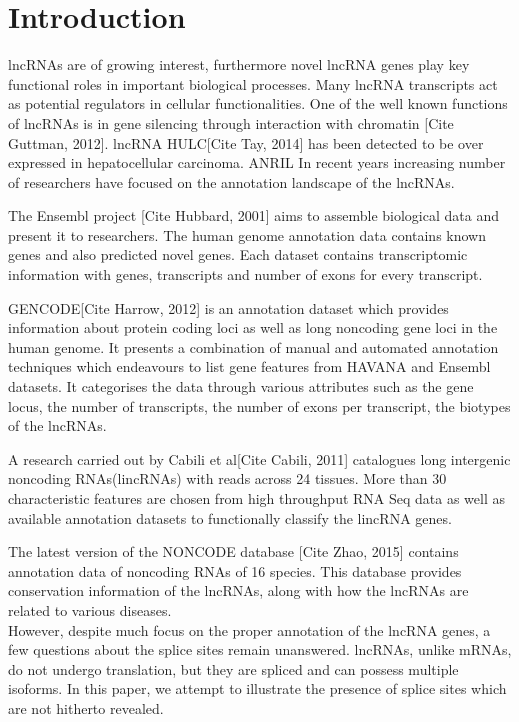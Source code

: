 \documentclass[ncrna,article,submit,moreauthors,pdftex,10pt,a4paper]{mdpi}
\begin{document}
\section{Introduction}

lncRNAs are of growing interest, furthermore novel lncRNA genes play key functional roles in important biological processes.
Many lncRNA transcripts act as potential regulators in cellular functionalities. One of the well known functions of lncRNAs is 
in gene silencing through interaction with chromatin [Cite Guttman, 2012]. lncRNA HULC[Cite Tay, 2014] has been detected to be over expressed in hepatocellular carcinoma. ANRIL 
In recent years increasing number of researchers have focused on the annotation landscape of the lncRNAs.

The Ensembl project [Cite Hubbard, 2001] aims to assemble biological data and present it to researchers. The human genome annotation data contains known genes
and also predicted novel genes. Each dataset contains transcriptomic information with genes, transcripts and number of exons for every transcript.

GENCODE[Cite Harrow, 2012] is an annotation dataset which provides information about protein coding loci as well as long noncoding gene loci in the human genome. 
It presents a combination of manual and automated annotation techniques which endeavours to list gene features from HAVANA and Ensembl datasets.
It categorises the data through various attributes such as the gene locus, the number of transcripts, the number of exons per transcript, 
the biotypes of the lncRNAs.

A research carried out by Cabili et al[Cite Cabili, 2011] catalogues long intergenic noncoding RNAs(lincRNAs) with reads across 24 tissues. More than 30 characteristic features 
are chosen from high throughput RNA Seq data as well as available annotation datasets to functionally classify the lincRNA genes.

The latest version of the NONCODE database [Cite Zhao, 2015] contains annotation data of noncoding RNAs of 16 species. This database provides conservation 
information of the lncRNAs, along with how the lncRNAs are related to various diseases.\\

However, despite much focus on the proper annotation of the lncRNA genes, a few questions about the splice sites remain unanswered. lncRNAs, unlike mRNAs,
do not undergo translation, but they are spliced and can possess multiple isoforms. In this paper, we attempt to illustrate the presence of 
splice sites which are not hitherto revealed. 
\end{document}

